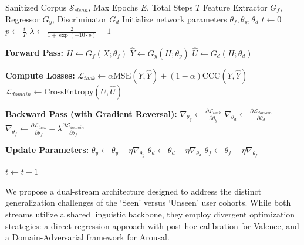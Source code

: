 \documentclass[11pt, a4paper]{article}
\begin{document}
\begin{algorithm*}[t]
\caption{Adversarial Training Loop for Arousal Stream}
\label{alg:dann_training}
\begin{algorithmic}[1]
\Require Sanitized Corpus $\mathcal{S}_{clean}$, Max Epochs $E$, Total Steps $T$
\Require Feature Extractor $G_f$, Regressor $G_y$, Discriminator $G_d$
\State Initialize network parameters $\theta_f, \theta_y, \theta_d$
\State $t \gets 0$ 
        \State $p \gets \frac{t}{T}$ 
        \State $\lambda \gets \frac{2}{1 + \exp(-10 \cdot p)} - 1$ 
        
        \State \textbf{Forward Pass:}
        \State $H \gets G_f(X; \theta_f)$ 
        \State $\hat{Y} \gets G_y(H; \theta_y)$ 
        \State $\hat{U} \gets G_d(H; \theta_d)$ 
        
        \State \textbf{Compute Losses:}
        \State $\mathcal{L}_{task} \gets \alpha\text{MSE}(Y, \hat{Y}) + (1-\alpha)\text{CCC}(Y, \hat{Y})$
        \State $\mathcal{L}_{domain} \gets \text{CrossEntropy}(U, \hat{U})$
        
        \State \textbf{Backward Pass (with Gradient Reversal):}
        \State $\nabla_{\theta_y} \gets \frac{\partial \mathcal{L}_{task}}{\partial \theta_y}$
        \State $\nabla_{\theta_d} \gets \frac{\partial \mathcal{L}_{domain}}{\partial \theta_d}$
        \State $\nabla_{\theta_f} \gets \frac{\partial \mathcal{L}_{task}}{\partial \theta_f} - \lambda \frac{\partial \mathcal{L}_{domain}}{\partial \theta_f}$ 
        
        \State \textbf{Update Parameters:}
        \State $\theta_y \gets \theta_y - \eta \nabla_{\theta_y}$
        \State $\theta_d \gets \theta_d - \eta \nabla_{\theta_d}$
        \State $\theta_f \gets \theta_f - \eta \nabla_{\theta_f}$
        
        \State $t \gets t + 1$
    \EndFor
\EndFor
\end{algorithmic}
\end{algorithm*}

We propose a dual-stream architecture designed to address the distinct generalization challenges of the `Seen' versus `Unseen' user cohorts. While both streams utilize a shared linguistic backbone, they employ divergent optimization strategies: a direct regression approach with post-hoc calibration for Valence, and a Domain-Adversarial framework for Arousal. 
\end{document}
